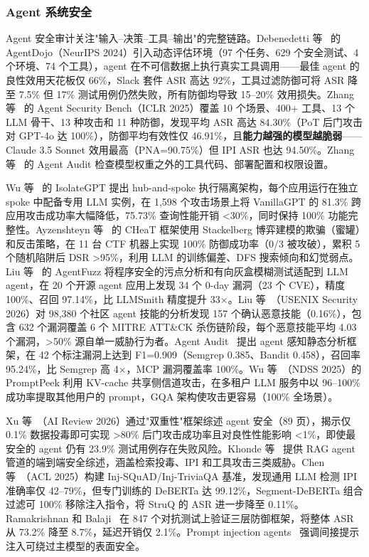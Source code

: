 \documentclass[11pt,a4paper,onecolumn]{article}
\begin{document}
\subsubsection{Agent 系统安全}
Agent 安全审计关注"输入--决策--工具--输出"的完整链路。Debenedetti 等~\cite{debenedetti2024agentdojo} 的 AgentDojo（NeurIPS 2024）引入动态评估环境（97 个任务、629 个安全测试、4 个环境、74 个工具），agent 在不可信数据上执行真实工具调用——最佳 agent 的良性效用天花板仅 66\%，Slack 套件 ASR 高达 92\%，工具过滤防御可将 ASR 降至 7.5\% 但 17\% 测试用例仍然失败，所有防御均导致 15--20\% 效用损失。Zhang 等~\cite{zhang2024asb} 的 Agent Security Bench（ICLR 2025）覆盖 10 个场景、400+ 工具、13 个 LLM 骨干、13 种攻击和 11 种防御，发现平均 ASR 高达 84.30\%（PoT 后门攻击对 GPT-4o 达 100\%），防御平均有效性仅 46.91\%，且\textbf{能力越强的模型越脆弱}——Claude 3.5 Sonnet 效用最高（PNA=90.75\%）但 IPI ASR 也达 94.50\%。Zhang 等~\cite{zhang2026agentaudit} 的 Agent Audit 检查模型权重之外的工具代码、部署配置和权限设置。

Wu 等~\cite{wu2025isolateGpt} 的 IsolateGPT 提出 hub-and-spoke 执行隔离架构，每个应用运行在独立 spoke 中配备专用 LLM 实例，在 1,598 个攻击场景上将 VanillaGPT 的 81.3\% 跨应用攻击成功率大幅降低，75.73\% 查询性能开销 <30\%，同时保持 100\% 功能完整性。Ayzenshteyn 等~\cite{ayzenshteyn2025cloak} 的 CHeaT 框架使用 Stackelberg 博弈建模的欺骗（蜜罐）和反击策略，在 11 台 CTF 机器上实现 100\% 防御成功率（0/3 被攻破），累积 5 个随机陷阱后 DSR >95\%，利用 LLM 的训练偏差、DFS 搜索倾向和幻觉弱点。Liu 等~\cite{liu2025taintstyle} 的 AgentFuzz 将程序安全的污点分析和有向灰盒模糊测试适配到 LLM agent，在 20 个开源 agent 应用上发现 34 个 0-day 漏洞（23 个 CVE），精度 100\%、召回 97.14\%，比 LLMSmith 精度提升 33$\times$。Liu 等~\cite{liu2026malskills,malicious_skills_2026}（USENIX Security 2026）对 98,380 个社区 agent 技能的分析发现 157 个确认恶意技能（0.16\%），包含 632 个漏洞覆盖 6 个 MITRE ATT\&CK 杀伤链阶段，每个恶意技能平均 4.03 个漏洞，>50\% 源自单一威胁行为者。Agent Audit~\cite{agent_audit_2026} 提出 agent 感知静态分析框架，在 42 个标注漏洞上达到 F1=0.909（Semgrep 0.385、Bandit 0.458），召回率 95.24\%，比 Semgrep 高 4$\times$，MCP 漏洞覆盖率 100\%。Wu 等~\cite{wu2025promptleakage}（NDSS 2025）的 PromptPeek 利用 KV-cache 共享侧信道攻击，在多租户 LLM 服务中以 96--100\% 成功率提取其他用户的 prompt，GQA 架构使攻击更容易（100\% 全场景）。

Xu 等~\cite{xu2026duality,agent_security_duality_2026}（AI Review 2026）通过"双重性"框架综述 agent 安全（89 页），揭示仅 0.1\% 数据投毒即可实现 >80\% 后门攻击成功率且对良性性能影响 <1\%，即使最安全的 agent 仍有 23.9\% 测试用例存在失败风险。Khonde 等~\cite{khonde2026ragsecurity,rag_agent_security_2026} 提供 RAG agent 管道的端到端安全综述，涵盖检索投毒、IPI 和工具攻击三类威胁。Chen 等~\cite{chen2025canipi}（ACL 2025）构建 Inj-SQuAD/Inj-TriviaQA 基准，发现通用 LLM 检测 IPI 准确率仅 42--79\%，但专门训练的 DeBERTa 达 99.12\%，Segment-DeBERTa 组合过滤可 100\% 移除注入指令，将 StruQ 的 ASR 进一步降至 0.11\%。Ramakrishnan 和 Balaji~\cite{ramakrishnan2025pidefense} 在 847 个对抗测试上验证三层防御框架，将整体 ASR 从 73.2\% 降至 8.7\%，延迟开销仅 2.1\%。Prompt injection agents~\cite{prompt_injection_agents_2025} 强调间接提示注入可绕过主模型的表面安全。
\end{document}
